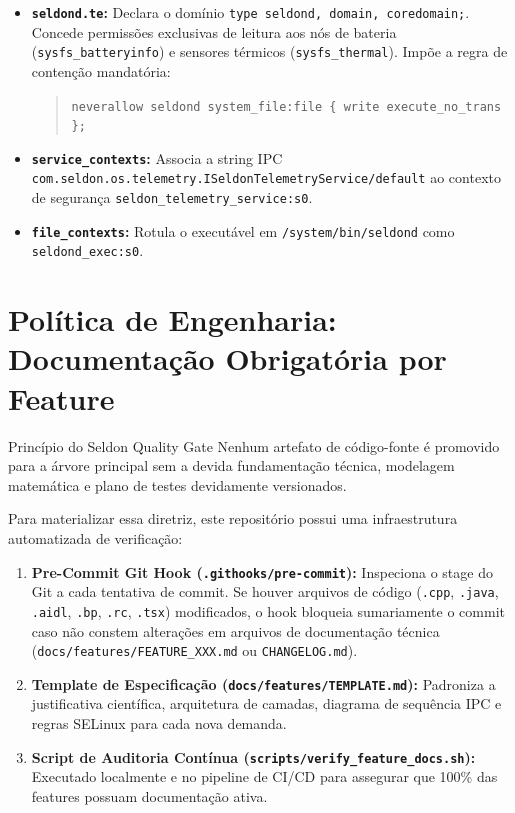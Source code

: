 \begin{itemize}
    \item \textbf{\texttt{seldond.te}:} Declara o domínio \texttt{type seldond, domain, coredomain;}. Concede permissões exclusivas de leitura aos nós de bateria (\texttt{sysfs\_batteryinfo}) e sensores térmicos (\texttt{sysfs\_thermal}). Impõe a regra de contenção mandatória:
    \begin{quote}
        \texttt{neverallow seldond system\_file:file \{ write execute\_no\_trans \};}
    \end{quote}
    \item \textbf{\texttt{service\_contexts}:} Associa a string IPC \texttt{com.seldon.os.telemetry.ISeldonTelemetryService/default} ao contexto de segurança \texttt{seldon\_telemetry\_service:s0}.
    \item \textbf{\texttt{file\_contexts}:} Rotula o executável em \texttt{/system/bin/seldond} como \texttt{seldond\_exec:s0}.
\end{itemize}

\section{Política de Engenharia: Documentação Obrigatória por Feature}

\begin{pedagogico}{Princípio do Seldon Quality Gate}
Nenhum artefato de código-fonte é promovido para a árvore principal sem a devida fundamentação técnica, modelagem matemática e plano de testes devidamente versionados.
\end{pedagogico}

Para materializar essa diretriz, este repositório possui uma infraestrutura automatizada de verificação:
\begin{enumerate}
    \item \textbf{Pre-Commit Git Hook (\texttt{.githooks/pre-commit}):} Inspeciona o stage do Git a cada tentativa de commit. Se houver arquivos de código (\texttt{.cpp}, \texttt{.java}, \texttt{.aidl}, \texttt{.bp}, \texttt{.rc}, \texttt{.tsx}) modificados, o hook bloqueia sumariamente o commit caso não constem alterações em arquivos de documentação técnica (\texttt{docs/features/FEATURE\_XXX.md} ou \texttt{CHANGELOG.md}).
    \item \textbf{Template de Especificação (\texttt{docs/features/TEMPLATE.md}):} Padroniza a justificativa científica, arquitetura de camadas, diagrama de sequência IPC e regras SELinux para cada nova demanda.
    \item \textbf{Script de Auditoria Contínua (\texttt{scripts/verify\_feature\_docs.sh}):} Executado localmente e no pipeline de CI/CD para assegurar que 100\% das features possuam documentação ativa.
\end{enumerate}

